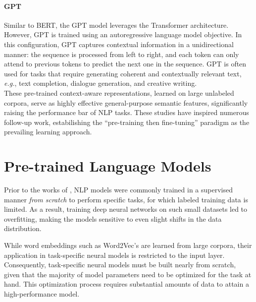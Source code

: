 \paragraph{GPT} Similar to \ac{BERT}, the \ac{GPT} model \citep{radford2018improving} leverages the Transformer architecture. However, \ac{GPT} is trained using an autoregressive language model objective. In this configuration, \ac{GPT} captures contextual information in a unidirectional manner: the sequence is processed from left to right, and each token can only attend to previous tokens to predict the next one in the sequence. \ac{GPT} is often used for tasks that require generating coherent and contextually relevant text, \textit{e.g.}, text completion, dialogue generation, and creative writing. \\

These pre-trained context-aware representations, learned on large unlabeled corpora, serve as highly effective general-purpose semantic features, significantly raising the performance bar of \ac{NLP} tasks. These studies have inspired numerous follow-up work, estabilishing the “pre-training then fine-tuning” paradigm as the prevailing learning approach. 


\section{Pre-trained Language Models}
\label{sec:chapter2-plms}

Prior to the works of \citet{peters-etal-2018-deep}, \ac{NLP} models were commonly trained in a supervised manner \textit{from scratch} to perform specific tasks, for which labeled training data is limited. As a result, training deep neural networks on such small datasets led to overfitting, making the models sensitive to even slight shifts in the data distribution. 

While word embeddings such as Word2Vec's \citep{mikolov2013efficient} are learned from large corpora, their application in task-specific neural models is restricted to the input layer. Consequently, task-specific neural models must be built nearly from scratch, given that the majority of model parameters need to be optimized for the task at hand. This optimization process requires substantial amounts of data to attain a high-performance model.

